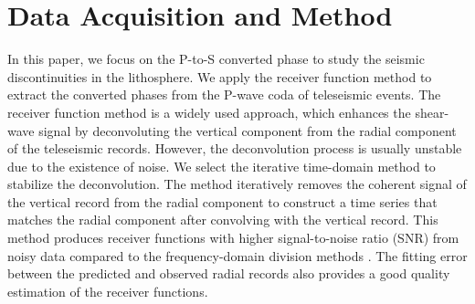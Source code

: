 \section{Data Acquisition and Method}

In this paper, we focus on the P-to-S converted phase to study the seismic discontinuities in the lithosphere. We apply the receiver function method \cite[e.g.][]{Langston_1979,ammon1991isolation} to extract the converted phases from the P-wave coda of teleseismic events. The receiver function method is a widely used approach, which enhances the shear-wave signal by deconvoluting the vertical component from the radial component of the teleseismic records. However, the deconvolution process is usually unstable due to the existence of noise. We select the iterative time-domain method \cite{ligorria1999iterative} to stabilize the deconvolution. The method iteratively removes the coherent signal of the vertical record from the radial component to construct a time series that matches the radial component after convolving with the vertical record. This method produces receiver functions with higher signal-to-noise ratio (SNR) from noisy data compared to the frequency-domain division methods \cite{ligorria1999iterative}. The fitting error between the predicted and observed radial records also provides a good quality estimation of the receiver functions. 
